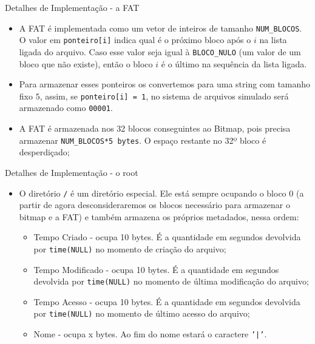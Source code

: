 \documentclass[10pt]{beamer}
\begin{document}
    \begin{frame}{Detalhes de Implementação - a FAT}
        \begin{itemize}
            \justifying
            \item A FAT é implementada como um vetor de inteiros de tamanho \texttt{NUM\_BLOCOS}. O valor em \texttt{ponteiro[i]} indica qual é o próximo bloco após o $i$ na lista ligada do arquivo. Caso esse valor seja igual à \texttt{BLOCO\_NULO} (um valor de um bloco que não existe), então o bloco $i$ é o último na sequência da lista ligada.
            \item Para armazenar esses ponteiros os convertemos para uma string com tamanho fixo $5$, assim, se \texttt{ponteiro[i] = 1}, no sistema de arquivos simulado será armazenado como \texttt{00001}.
            \item A FAT é armazenada nos 32 blocos conseguintes ao Bitmap, pois precisa armazenar \texttt{NUM\_BLOCOS*5 bytes}. O espaço restante no 32º bloco é desperdiçado;
        \end{itemize}
    \end{frame}
    \begin{frame}{Detalhes de Implementação - o root}
        \begin{itemize}
            \justifying
            \item O diretório \texttt{/} é um diretório especial. Ele está sempre ocupando o bloco 0 (a partir de agora desconsideraremos os blocos necessário para armazenar o bitmap e a FAT) e também armazena os próprios metadados, nessa ordem:
            \begin{itemize}
                \justifying
                \item Tempo Criado - ocupa 10 bytes. É a quantidade em segundos devolvida por \texttt{time(NULL)} no momento de criação do arquivo;
                \item Tempo Modificado - ocupa 10 bytes. É a quantidade em segundos devolvida por \texttt{time(NULL)} no momento de última modificação do arquivo;
                \item Tempo Acesso - ocupa 10 bytes. É a quantidade em segundos devolvida por \texttt{time(NULL)} no momento de último acesso do arquivo;
                \item Nome - ocupa x bytes. Ao fim do nome estará o caractere \texttt{'|'}.
            \end{itemize}
        \end{itemize}
    \end{frame}
\end{document}
